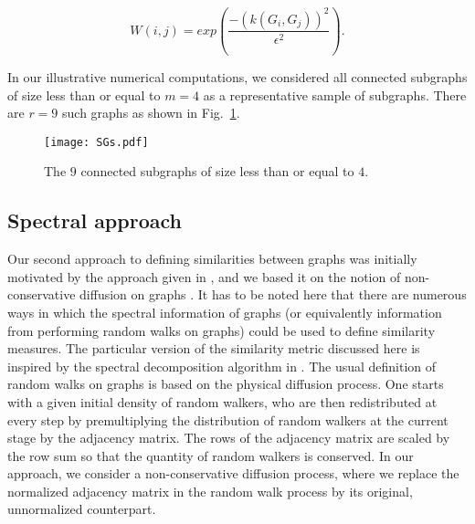 \begin{equation}
  W(i,j) = exp \left( \frac{-(k(G_i,G_j))^2}{\epsilon^2} \right).
  \label{eq:sim1}
\end{equation}

In our illustrative numerical computations, we considered all
connected subgraphs of size less than or equal to $m=4$ as a
representative sample of subgraphs.
% 
There are $r=9$ such graphs as shown in Fig.~\ref{fig:SGs}.


\begin{figure}
  \begin{center}
    \texttt{[image: SGs.pdf]}
    \caption{\label{fig:SGs} The $9$ connected subgraphs of size less
      than or equal to $4$.  }
  \end{center}
\end{figure}


\subsection{\label{ss:s}Spectral approach}

Our second approach to defining similarities between graphs was
initially motivated by the approach given in \cite{vishwanathan_graph_2010}, and we
based it on the notion of non-conservative diffusion on graphs
\cite{ghosh_non-conservative_2011}.
% 
It has to be noted here that there are numerous ways in which the
spectral information of graphs (or equivalently information from
performing random walks on graphs) could be used to define similarity
measures.
% 
The particular version of the similarity metric discussed here is
inspired by the spectral decomposition algorithm in \cite{vishwanathan_graph_2010}.
% 
The usual definition of random walks on graphs is based on the
physical diffusion process.
% 
One starts with a given initial density of random walkers, who are
then redistributed at every step by premultiplying the distribution of
random walkers at the current stage by the adjacency matrix.
% 
The rows of the adjacency matrix are scaled by the row sum so that the
quantity of random walkers is conserved.
% 
In our approach, we consider a non-conservative diffusion process,
where we replace the normalized adjacency matrix in the random walk
process by its original, unnormalized counterpart.


